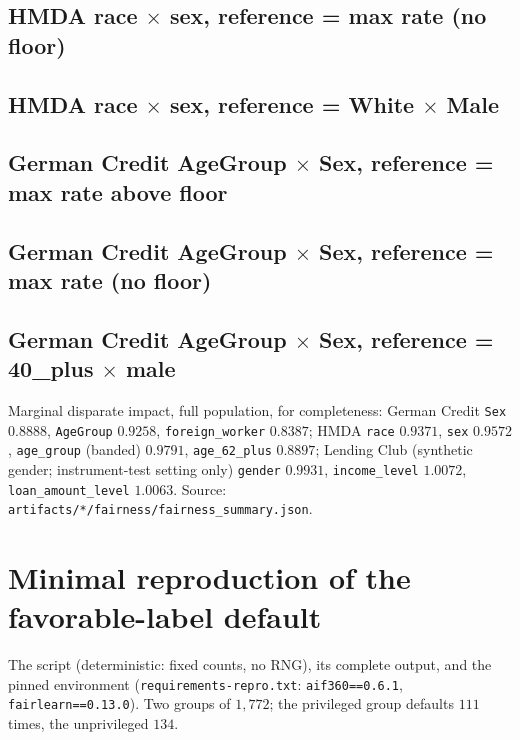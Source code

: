 \documentclass[sigconf,nonacm]{acmart}
\begin{document}
\subsection*{HMDA race $\times$ sex, reference = max rate (no floor)}
{\small}

\subsection*{HMDA race $\times$ sex, reference = White $\times$ Male}
{\small}

\subsection*{German Credit AgeGroup $\times$ Sex, reference = max rate above floor}
{\small}

\subsection*{German Credit AgeGroup $\times$ Sex, reference = max rate (no floor)}
{\small}

\subsection*{German Credit AgeGroup $\times$ Sex, reference = 40\_plus $\times$ male}
{\small}

\medskip\noindent Marginal disparate impact, full population, for
completeness: German Credit \texttt{Sex} $0.8888$, \texttt{AgeGroup} $0.9258$,
\texttt{foreign\_worker} $0.8387$; HMDA \texttt{race} $0.9371$, \texttt{sex}
$0.9572$, \texttt{age\_group} (banded) $0.9791$, \texttt{age\_62\_plus}
$0.8897$; Lending Club (synthetic gender; instrument-test setting only)
\texttt{gender} $0.9931$, \texttt{income\_level} $1.0072$,
\texttt{loan\_amount\_level} $1.0063$. Source:
\texttt{artifacts/*/fairness/fairness\_summary.json}.

\section{Minimal reproduction of the favorable-label default}
\label{app:repro}

The script (deterministic: fixed counts, no RNG), its complete output, and
the pinned environment (\texttt{requirements-repro.txt}: \texttt{aif360==0.6.1},
\texttt{fairlearn==0.13.0}). Two groups of $1{,}772$; the privileged group
defaults $111$ times, the unprivileged $134$.
\end{document}
